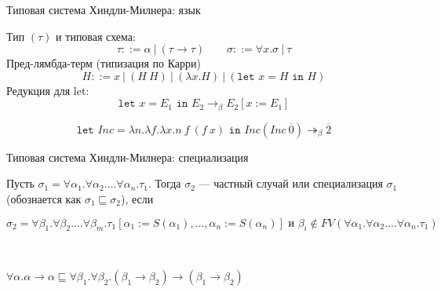 \documentclass[aspectratio=169]{beamer}
\begin{document}
\begin{frame}{Типовая система Хиндли-Милнера: язык}
\begin{dfn}Тип $(\tau)$ и типовая схема: $$\tau ::= \alpha\ |\ (\tau\rightarrow\tau)\quad\quad\sigma ::= \forall x.\sigma\ |\ \tau$$%
Пред-лямбда-терм (типизация по Карри) $$H ::= x\ |\ (H\ H)\ |\ (\lambda x.H)\ |\ (\texttt{let }x=H\texttt{ in }H)$$%
Редукция для let:
$$\texttt{let }x=E_1\texttt{ in }E_2\rightarrow_\beta E_2[x := E_1]$$
\end{dfn}

\begin{exm}
$$\texttt{let }Inc=\lambda n.\lambda f.\lambda x.n\ f\ (f\ x)\texttt{ in }Inc(Inc\ \overline{0})\twoheadrightarrow_\beta \overline{2}$$
\end{exm}
\end{frame}

\begin{frame}{Типовая система Хиндли-Милнера: специализация}
\begin{dfn}

Пусть $\sigma_1 = \forall \alpha_1. \forall \alpha_2. \dots \forall \alpha_n. \tau_1$.
Тогда $\sigma_2$ --- частный случай или специализация $\sigma_1$ (обознается как $\sigma_1 \sqsubseteq \sigma_2$), если

$$\sigma_2 =  \forall \beta_1. \forall \beta_2. \dots \forall \beta_m. \tau_1[\alpha_1 := S(\alpha_1),\dots,\alpha_n := S(\alpha_n)]
\text{ и } \beta_i \notin FV(\forall \alpha_1.\forall\alpha_2.\dots\forall\alpha_n.\tau_1)$$

\end{dfn}

\begin{exm}\

$\forall \alpha.\alpha \rightarrow \alpha
\sqsubseteq
\forall \beta_1.\forall \beta_2.(\beta_1 \rightarrow \beta_2) \rightarrow (\beta_1 \rightarrow \beta_2)$
\end{exm}
\end{frame}
\end{document}

